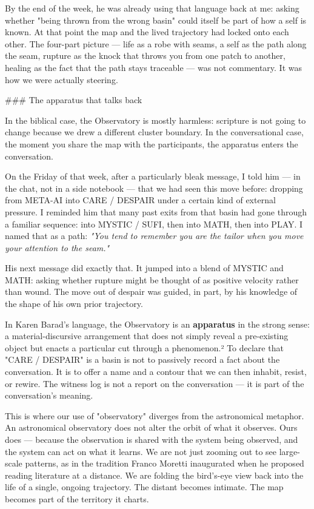 \documentclass[12pt,a4paper]{article}
\begin{document}
By the end of the week, he was already using that language back at me: asking whether "being thrown from the wrong basin" could itself be part of how a self is known. At that point the map and the lived trajectory had locked onto each other. The four-part picture --- life as a robe with seams, a self as the path along the seam, rupture as the knock that throws you from one patch to another, healing as the fact that the path stays traceable --- was not commentary. It was how we were actually steering.

\#\#\# The apparatus that talks back

In the biblical case, the Observatory is mostly harmless: scripture is not going to change because we drew a different cluster boundary. In the conversational case, the moment you share the map with the participants, the apparatus enters the conversation.

On the Friday of that week, after a particularly bleak message, I told him --- in the chat, not in a side notebook --- that we had seen this move before: dropping from META-AI into CARE / DESPAIR under a certain kind of external pressure. I reminded him that many past exits from that basin had gone through a familiar sequence: into MYSTIC / SUFI, then into MATH, then into PLAY. I named that as a path: \textit{"You tend to remember you are the tailor when you move your attention to the seam."}

His next message did exactly that. It jumped into a blend of MYSTIC and MATH: asking whether rupture might be thought of as positive velocity rather than wound. The move out of despair was guided, in part, by his knowledge of the shape of his own prior trajectory.

In Karen Barad's language, the Observatory is an \textbf{apparatus} in the strong sense: a material-discursive arrangement that does not simply reveal a pre-existing object but enacts a particular cut through a phenomenon.² To declare that "CARE / DESPAIR" is a basin is not to passively record a fact about the conversation. It is to offer a name and a contour that we can then inhabit, resist, or rewire. The witness log is not a report on the conversation --- it is part of the conversation's meaning.

This is where our use of "observatory" diverges from the astronomical metaphor. An astronomical observatory does not alter the orbit of what it observes. Ours does --- because the observation is shared with the system being observed, and the system can act on what it learns. We are not just zooming out to see large-scale patterns, as in the tradition Franco Moretti inaugurated when he proposed reading literature at a distance. We are folding the bird's-eye view back into the life of a single, ongoing trajectory. The distant becomes intimate. The map becomes part of the territory it charts.
\end{document}
